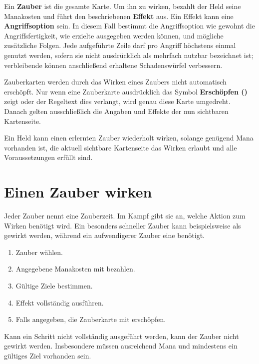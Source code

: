 Ein \textbf{Zauber} ist die gesamte Karte. Um ihn zu wirken, bezahlt der Held seine Manakosten und führt den beschriebenen \textbf{Effekt} aus. Ein Effekt kann eine \textbf{Angriffsoption} sein. In diesem Fall bestimmt die Angriffsoption wie gewohnt die Angriffsfertigkeit, wie erzielte \star{} ausgegeben werden können, und mögliche zusätzliche Folgen. Jede aufgeführte Zeile darf pro Angriff höchstens einmal genutzt werden, sofern sie nicht ausdrücklich als mehrfach nutzbar bezeichnet ist; verbleibende \star{} können anschließend erhaltene Schadenswürfel verbessern.

Zauberkarten werden durch das Wirken eines Zaubers nicht automatisch erschöpft. Nur wenn eine Zauberkarte ausdrücklich das Symbol \textbf{Erschöpfen (\exhaust)} zeigt oder der Regeltext dies verlangt, wird genau diese Karte umgedreht. Danach gelten ausschließlich die Angaben und Effekte der nun sichtbaren Kartenseite.

Ein Held kann einen erlernten Zauber wiederholt wirken, solange genügend Mana vorhanden ist, die aktuell sichtbare Kartenseite das Wirken erlaubt und alle Voraussetzungen erfüllt sind.

\section{Einen Zauber wirken}

Jeder Zauber nennt eine Zauberzeit. Im Kampf gibt sie an, welche Aktion zum Wirken benötigt wird. Ein besonders schneller Zauber kann beispielsweise als \freeAction{} gewirkt werden, während ein aufwendigerer Zauber eine \standardAction{} benötigt.

\begin{kurzregel}[title=Einen Zauber wirken]
\begin{enumerate}
  \item Zauber wählen.
  \item Angegebene Manakosten mit \manaLoss{} bezahlen.
  \item Gültige Ziele bestimmen.
  \item Effekt vollständig ausführen.
  \item Falls angegeben, die Zauberkarte mit \exhaust{} erschöpfen.
\end{enumerate}
\end{kurzregel}

Kann ein Schritt nicht vollständig ausgeführt werden, kann der Zauber nicht gewirkt werden. Insbesondere müssen ausreichend Mana und mindestens ein gültiges Ziel vorhanden sein.


